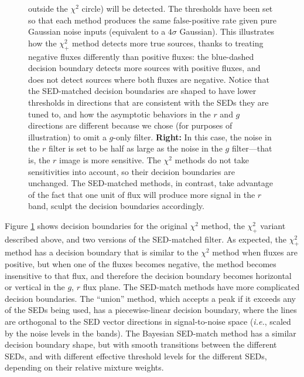 \documentclass[11pt,letterpaper,linenumbers]{aastex63}
\newcommand{\latin}[1]{\emph{#1}}
\newcommand{\ie}{\latin{i.e.}}
\newcommand{\chipos}{\chi_+}
\begin{document}
\begin{figure}
{    outside the $\chi^2$ circle) will be detected.  The thresholds
    have been set so that each method produces the same false-positive
    rate given pure Gaussian noise inputs (equivalent to a $4 \sigma$
    Gaussian).  This illustrates how the $\chipos^2$ method detects
    more true sources, thanks to treating negative fluxes differently
    than positive fluxes: the blue-dashed decision boundary detects
    more sources with positive fluxes, and does not detect sources
    where both fluxes are negative.  Notice that the SED-matched
    decision boundaries are shaped to have lower thresholds in
    directions that are consistent with the SEDs they are tuned to,
    and how the asymptotic behaviors in the $r$ and $g$ directions are
    different because we chose (for purposes of illustration) to omit
    a $g$-only filter.  \textbf{Right:} In this case, the noise in the
    $r$ filter is set to be half as large as the noise in the $g$
    filter---that is, the $r$ image is more sensitive.  The $\chi^2$
    methods do not take sensitivities into account, so their decision
    boundaries are unchanged.  The SED-matched methods, in contrast,
    take advantage of the fact that one unit of flux will produce more
    signal in the $r$ band, sculpt the decision boundaries
    accordingly.
  \label{fig:chipos_boundary}}
\end{figure}

Figure \ref{fig:chipos_boundary} shows decision boundaries for the
original $\chi^2$ method, the $\chipos^2$ variant described above, and
two versions of the SED-matched filter.  As expected, the $\chipos^2$
method has a decision boundary that is similar to the $\chi^2$ method
when fluxes are positive, but when one of the fluxes becomes negative,
the method becomes insensitive to that flux, and therefore the
decision boundary becomes horizontal or vertical in the $g$, $r$ flux
plane.  The SED-match methods have more complicated decision
boundaries.  The ``union'' method, which accepts a peak if it exceeds
any of the SEDs being used, has a piecewise-linear decision boundary,
where the lines are orthogonal to the SED vector directions in
signal-to-noise space (\ie, scaled by the noise levels in the bands).
The Bayesian SED-match method has a similar decision boundary shape,
but with smooth transitions between the different SEDs, and with
different effective threshold levels for the different SEDs, depending
on their relative mixture weights.
\end{document}
